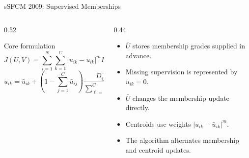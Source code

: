 \documentclass[t,aspectratio=169]{beamer}
\begin{document}
\begin{frame}{sSFCM 2009: Supervised Memberships}
  \begin{columns}[T,onlytextwidth]
    \begin{column}{0.52\textwidth}
      \begin{block}{Core formulation}
        \[
          J(U,V)=\sum_{i=1}^{N}\sum_{k=1}^{C}
          \left|u_{ik}-\bar{u}_{ik}\right|^{m}D_{ik}^{2}
        \]
        \[
          u_{ik}=\bar{u}_{ik}+
          \left(1-\sum_{j=1}^{C}\bar{u}_{ij}\right)
          \frac{D_{ik}^{-2/(m-1)}}
          {\sum_{\ell=1}^{C}D_{i\ell}^{-2/(m-1)}}
        \]
      \end{block}
    \end{column}
    \begin{column}{0.44\textwidth}
      \begin{itemize}
        \item $\bar U$ stores membership grades supplied in advance.
        \item Missing supervision is represented by $\bar u_{ik}=0$.
        \item $\bar U$ changes the membership update directly.
        \item Centroids use weights $|u_{ik}-\bar u_{ik}|^m$.
        \item The algorithm alternates membership and centroid updates.
      \end{itemize}
    \end{column}
  \end{columns}
\end{frame}
\end{document}
